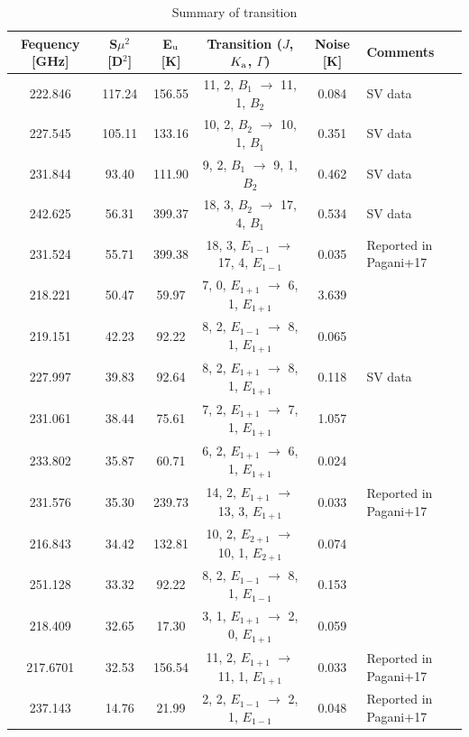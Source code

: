 \renewcommand{\arraystretch}{1.5}
\begin{table}[H]
\begin{center}

  \caption{Summary of transition}
  \label{tab:blendOri}
{\scriptsize
  \begin{tabular}{cccccl} \hline
   Fequency [GHz]& S$\mu ^{2}$ [D$^2$] & E$_{\rm{u}}$ [K]& Transition ($J$, $K_{\rm{a}}$, $\Gamma$) & Noise [K]  &Comments \\ \hline 
222.846&  117.24&  156.55&  11, 2, $B_{1}$ $\rightarrow$ 11, 1, $B_{2}$    &  0.084&  SV data \\
227.545&  105.11&  133.16&  10, 2, $B_{2}$ $\rightarrow$ 10, 1, $B_{1}$    &  0.351&  SV data\\
231.844&  93.40&  111.90&  9, 2, $B_{1}$ $\rightarrow$ 9, 1, $B_{2}$   &  0.462&  SV data\\
242.625&  56.31&  399.37&  18, 3, $B_{2}$ $\rightarrow$ 17, 4, $B_{1}$   &  0.534& SV data  \\
231.524&  55.71&  399.38& 18, 3, $E_{1-1}$ $\rightarrow$ 17, 4, $E_{1-1}$  &  0.035&  Reported in Pagani+17\\
218.221&  50.47&  59.97& 7, 0, $E_{1+1}$ $\rightarrow$ 6, 1, $E_{1+1}$  &  3.639&  \\
219.151&  42.23&  92.22& 8, 2, $E_{1-1}$ $\rightarrow$ 8, 1, $E_{1+1}$  &  0.065&  \\
227.997&  39.83&  92.64&  8, 2, $E_{1+1}$ $\rightarrow$ 8, 1, $E_{1+1}$   &  0.118&  SV data\\
231.061&  38.44&  75.61&  7, 2, $E_{1+1}$ $\rightarrow$ 7, 1, $E_{1+1}$  &  1.057&  \\
233.802&  35.87&  60.71&  6, 2, $E_{1+1}$ $\rightarrow$ 6, 1, $E_{1+1}$   &  0.024&  \\
231.576&  35.30&  239.73&  14, 2, $E_{1+1}$ $\rightarrow$ 13, 3, $E_{1+1}$  &  0.033&  Reported in Pagani+17\\
216.843&  34.42&  132.81&  10, 2, $E_{2+1}$ $\rightarrow$ 10, 1, $E_{2+1}$  &  0.074&  \\
251.128&  33.32&  92.22& 8, 2, $E_{1-1}$ $\rightarrow$ 8, 1, $E_{1-1}$ &  0.153&  \\
218.409&  32.65&  17.30&  3, 1, $E_{1+1}$ $\rightarrow$ 2, 0, $E_{1+1}$  &  0.059&  \\
217.6701&  32.53&  156.54& 11, 2, $E_{1+1}$ $\rightarrow$ 11, 1, $E_{1+1}$ &  0.033&  Reported in Pagani+17 \\
237.143&  14.76&  21.99& 2, 2, $E_{1-1}$ $\rightarrow$ 2, 1, $E_{1-1}$ &  0.048&  Reported in Pagani+17 \\ \hline
  \end{tabular}
  }
\end{center}
\end{table}


